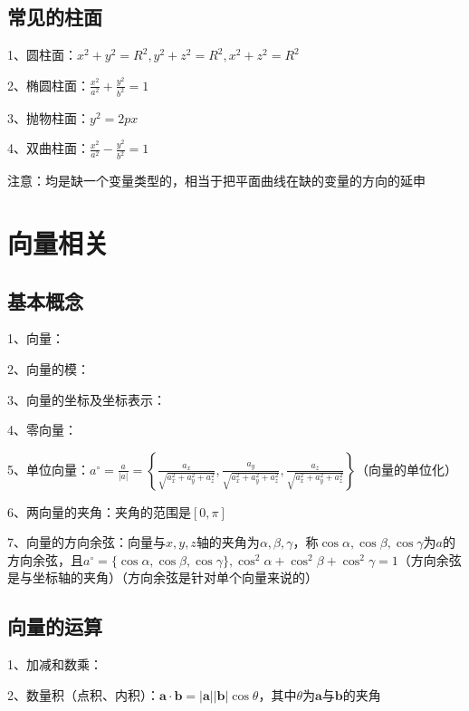 \subsection{常见的柱面}

1、圆柱面：$x^{2}+y^{2}=R^{2}, y^{2}+z^{2}=R^{2}, x^{2}+z^{2}=R^{2}$

2、椭圆柱面：$\frac{x^{2}}{a^{2}}+\frac{y^{2}}{b^{2}}=1$

3、抛物柱面：$y^{2}=2 p x$

4、双曲柱面：$\frac{x^{2}}{a^{2}}-\frac{y^{2}}{b^{2}}=1$

注意：均是缺一个变量类型的，相当于把平面曲线在缺的变量的方向的延申

\section{向量相关}



\subsection{基本概念}

1、向量：

2、向量的模：

3、向量的坐标及坐标表示：

4、零向量：

5、单位向量：$a^{\circ}=\frac{a}{|a|}=\left\{\frac{a_{x}}{\sqrt{a_{x}^{2}+a_{y}^{2}+a_{z}^{2}}}, \frac{a_{y}}{\sqrt{a_{x}^{2}+a_{y}^{2}+a_{z}^{2}}}, \frac{a_{z}}{\sqrt{a_{x}^{2}+a_{y}^{2}+a_{z}^{2}}}\right\}$（向量的单位化）

6、两向量的夹角：夹角的范围是$[0,\pi]$

7、向量的方向余弦：向量与$x,y,z$轴的夹角为$\alpha, \beta, \gamma$，称$\cos \alpha, \cos \beta, \cos \gamma$为$a$的方向余弦，且$a^{\circ}=\{\cos \alpha, \cos \beta, \cos \gamma\}, \cos ^{2} \alpha+\cos ^{2} \beta+\cos ^{2} \gamma=1$（方向余弦是与坐标轴的夹角）（方向余弦是针对单个向量来说的）



\subsection{向量的运算}

1、加减和数乘：

2、数量积（点积、内积）：$\boldsymbol{a} \cdot \boldsymbol{b}=|\boldsymbol{a}||\boldsymbol{b}| \cos \theta$，其中$\theta$为$\boldsymbol{a}$与$\boldsymbol{b}$的夹角

